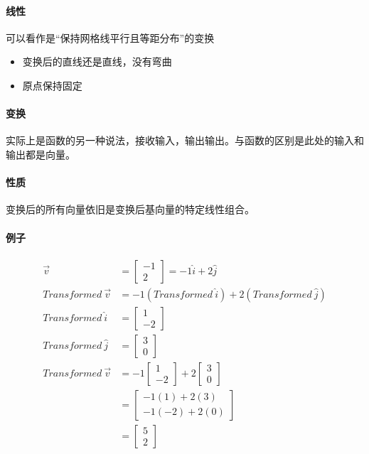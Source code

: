 \documentclass[UTF8]{ctexart}
\begin{document}
\paragraph{线性}
可以看作是“保持网格线平行且等距分布”的变换
\begin{itemize}
	\item 变换后的直线还是直线，没有弯曲
	\item 原点保持固定
\end{itemize}
\paragraph{变换}
实际上是函数的另一种说法，接收输入，输出输出。与函数的区别是此处的输入和输出都是向量。
\paragraph{性质}
变换后的所有向量依旧是变换后基向量的特定线性组合。
\paragraph{例子}
\begin{align*}
	\overrightarrow{v} &= \begin{bmatrix}
		-1 \\ 2
	\end{bmatrix} = -1\hat{i} + 2\hat{j} \\
	Transformed\ \overrightarrow{v} &= -1(Transformed\ \hat{i}) + 2(Transformed\ \hat{j}) \\
	Transformed\ \hat{i} &= \begin{bmatrix}
		1 \\ -2
	\end{bmatrix}\\
	Transformed\ \hat{j} &= \begin{bmatrix}
		3 \\ 0
	\end{bmatrix} \\
	Transformed\ \overrightarrow{v} &= -1 \begin{bmatrix}
		1 \\ -2
	\end{bmatrix} + 2 \begin{bmatrix}
		3 \\ 0
	\end{bmatrix} \\
	&= \begin{bmatrix}
		-1(1)+2(3) \\ -1(-2)+2(0)
	\end{bmatrix} \\
	&= \begin{bmatrix}
		5 \\ 2
	\end{bmatrix}
\end{align*}
\end{document}
